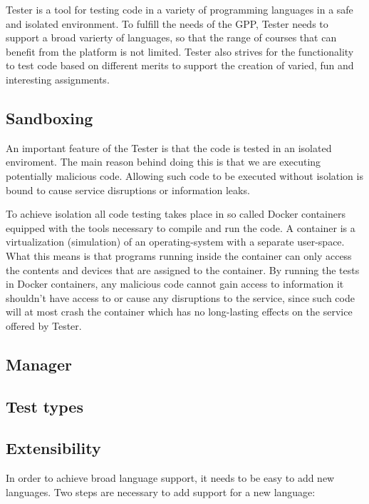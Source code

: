 Tester is a tool for testing code in a variety of programming languages in a safe and isolated environment. To fulfill the needs of the GPP, Tester needs to support a  broad varierty of languages, so that the range of courses that can benefit from the platform is not limited. Tester also strives for the functionality to test code based on different merits to support the creation of varied, fun and interesting assignments.

\subsection{Sandboxing}
An important feature of the Tester is that the code is tested in an isolated enviroment. The main reason behind doing this is that we are executing potentially malicious code. Allowing such code to be executed without isolation is bound to cause service disruptions or information leaks. 

To achieve isolation all code testing takes place in so called Docker containers equipped with the tools necessary to compile and run the code. A container is a virtualization (simulation) of an operating-system with a separate user-space. What this means is that programs running inside the container can only access the contents and devices that are assigned to the container. By running the tests in Docker containers, any malicious code cannot gain access to information it shouldn't have access to or cause any disruptions to the service, since such code will at most crash the container which has no long-lasting effects on the service offered by Tester.
\subsection{Manager}
\subsection{Test types}

\subsection{Extensibility}
In order to achieve broad language support, it needs to be easy to add new languages. Two steps are necessary to add support for a new language:

